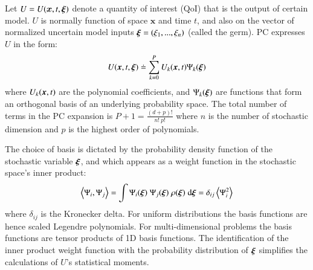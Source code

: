 Let $U=U(\bm{x},t,\xxi)$ denote a quantity of 
interest (QoI) that is the output of certain model.
$U$ is normally function of space $\bm{x}$ and time $t$, and 
also on the vector of normalized uncertain model inputs $\xxi=(\xi_1,...,\xi_n)$ (called the germ). PC expresses $U$ in the form:
\begin{equation}
  U(\xbold,t,\xxi) \doteq \sum_{k = 0}^P U_k(\xbold,t) \Psi_k(\xxi)
\label{eq:stochseries}
\end{equation} 
where $U_k(\xbold,t)$ are the polynomial coefficients, and
$\Psi_k(\xxi)$ are functions that form an orthogonal basis of an underlying probability
space. The total number of terms in the PC expansion is
$P+1 = \frac{(d+p)! }{n!\ p!}$ where $n$ is the number of stochastic dimension and $p$ is the highest order
of polynomials. 

The choice of basis is dictated by the probability density
function of the stochastic variable $\xxi$, and which appears as a weight
function in the stochastic space's inner product:
\begin{equation}
 \left<\Psi_i,\Psi_j\right> = \int \Psi_i(\xxi) \;\Psi_j(\xxi) \; \rho(\xxi) \; \mbox{d}\xxi=\delta_{ij}\ave{\Psi_i^2}
\label{eq:inner}
\end{equation}
where $\delta_{ij}$ is the Kronecker delta.
For uniform
distributions the basis functions are hence scaled Legendre polynomials.
For multi-dimensional problems the basis functions are
tensor products of 1D basis functions. The identification of the inner product weight function
with the probability distribution of $\xxi$ simplifies the calculations of $U$'s statistical moments.





